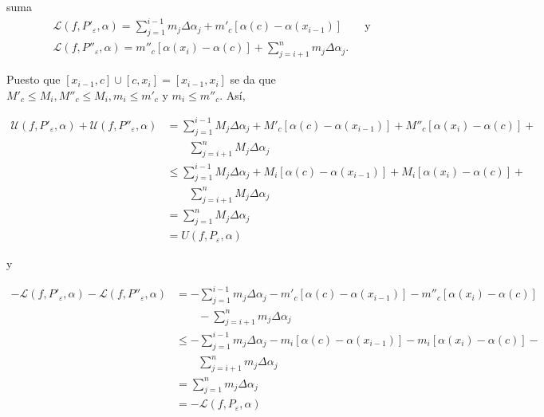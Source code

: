 \documentclass[fleqn, 12pt]{article}
\newenvironment{ejercicio}[1]{\begin{ejer}[breakable, pad at break = 5mm, leftrule = 0.7mm, rightrule = 0.7mm, right = 2mm, left = 2mm, enlarge bottom finally by = 3mm]{}{#1}}{\end{ejer}}
\begin{document}
\begin{ejercicio}{suma}
		\begin{align*}
			&\mathcal{L} \left( f, P'_\varepsilon, \alpha \right) = \sum_{j=1}^{i-1} m_j \Delta \alpha_j + m'_c \left[ \alpha(c) - \alpha\left( x_{i-1} \right) \right] \qquad \mbox{y} \\
			&\mathcal{L} \left( f, P''_\varepsilon, \alpha \right) = m''_c \left[ \alpha(x_i) - \alpha\left( c \right) \right] + \sum_{j=i+1}^{n} m_j \Delta \alpha_j.
		\end{align*}

		Puesto que $ \left[ x_{i-1}, c \right] \cup \left[ c, x_i \right] = \left[ x_{i-1}, x_i \right] $ se da que $ M'_c \leq M_i, M''_c \leq M_i, m_i \leq m'_c $ y $ m_i \leq m''_c $. Así,

		\begin{align*}
			\mathcal{U} \left( f, P'_\varepsilon, \alpha \right) + \mathcal{U} \left( f, P''_\varepsilon, \alpha \right) &= \sum_{j=1}^{i-1} M_j \Delta \alpha_j + M'_c \left[ \alpha(c) - \alpha\left( x_{i-1} \right) \right] + M''_c \left[ \alpha(x_i) - \alpha\left( c \right) \right] + \\
			& \qquad \sum_{j=i+1}^{n} M_j \Delta \alpha_j \\
			&\leq \sum_{j=1}^{i-1} M_j \Delta \alpha_j + M_i \left[ \alpha(c) - \alpha\left( x_{i-1} \right) \right] + M_i \left[ \alpha(x_i) - \alpha\left( c \right) \right] + \\
			& \qquad \sum_{j=i+1}^{n} M_j \Delta \alpha_j \\
			&= \sum_{j=1}^{n} M_j \Delta \alpha_j \\
			&= U(f,P_\varepsilon,\alpha)
		\end{align*}
		
		y

		\begin{align*}
			- \mathcal{L} \left( f, P'_\varepsilon, \alpha \right) - \mathcal{L} \left( f, P''_\varepsilon, \alpha \right) &= - \sum_{j=1}^{i-1} m_j \Delta \alpha_j - m'_c \left[ \alpha(c) - \alpha\left( x_{i-1} \right) \right] - m''_c \left[ \alpha(x_i) - \alpha\left( c \right) \right]  \\
			& \qquad - \sum_{j=i+1}^{n} m_j \Delta \alpha_j \\
			&\leq - \sum_{j=1}^{i-1} m_j \Delta \alpha_j - m_i \left[ \alpha(c) - \alpha\left( x_{i-1} \right) \right] - m_i \left[ \alpha(x_i) - \alpha\left( c \right) \right] - \\
			& \qquad\sum_{j=i+1}^{n} m_j \Delta \alpha_j \\
			&= \sum_{j=1}^{n} m_j \Delta \alpha_j \\
			&= -\mathcal{L} (f,P_\varepsilon,\alpha)
		\end{align*}


\end{ejercicio}
\end{document}
